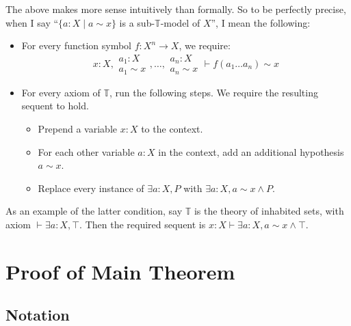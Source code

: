 \documentclass{article}
\newcommand*{\T}{\mathbb{T}}
\begin{document}
The above makes more sense intuitively than formally.
So to be perfectly precise, when I say
``\(\{a : X \mid a \sim x\}\) is a sub-\(\T\)-model of \(X\)'',
I mean the following:
\begin{itemize}
    \item For every function symbol \(f : X^n \to X\), we require:
    \[x : X, \substack{a_1 : X \\ a_1 \sim x}, \dots, \substack{a_n : X \\ a_n \sim x} \vdash f(a_1 \dots a_n) \sim x\]
    \item For every axiom of \(\T\), run the following steps. We require the resulting sequent to hold.
    \begin{itemize}
        \item Prepend a variable \(x : X\) to the context.
        \item For each other variable \(a : X\) in the context, add an additional hypothesis \(a \sim x\).
        \item Replace every instance of \(\exists a : X, P\) with \(\exists a : X, a \sim x \land P\).
    \end{itemize}
\end{itemize}

As an example of the latter condition, say \(\T\) is the theory of inhabited sets, with axiom \(\vdash \exists a : X, \top\).
Then the required sequent is \(x : X \vdash \exists a : X, a \sim x \land \top\).

\section{Proof of Main Theorem}

\subsection{Notation}
\end{document}
